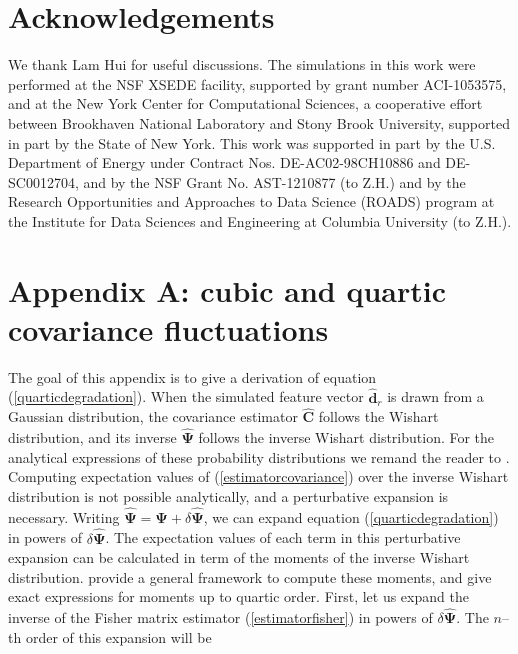 \documentclass[reprint,aps,prd,superscriptaddress,showkeys,showpacs]{revtex4-1}
\newcommand{\bb}[1]{\mathbf{#1}}
\newcommand{\bbh}[1]{\mathbf{\hat{#1}}}
\begin{document}
 

\section*{Acknowledgements}
We thank Lam Hui for useful discussions.  The simulations in this work
were performed at the NSF XSEDE facility, supported by grant number
ACI-1053575, and at the New York Center for Computational Sciences, a
cooperative effort between Brookhaven National Laboratory and Stony
Brook University, supported in part by the State of New York. This
work was supported in part by the U.S. Department of Energy under
Contract Nos. DE-AC02-98CH10886 and DE-SC0012704, and by the NSF Grant
No. AST-1210877 (to Z.H.) and by the Research Opportunities and
Approaches to Data Science (ROADS) program at the Institute for Data
Sciences and Engineering at Columbia University (to Z.H.).  



%    
\section*{Appendix A: cubic and quartic covariance fluctuations}
\label{appendixA}

The goal of this appendix is to give a derivation of equation (\ref{quarticdegradation}). When the simulated feature vector $\bbh{d}_r$ is drawn from a Gaussian distribution, the covariance estimator $\bbh{C}$ follows the Wishart distribution, and its inverse $\bbh{\Psi}$ follows the inverse Wishart distribution. For the analytical expressions of these probability distributions we remand the reader to \citep{Taylor12}. Computing expectation values of (\ref{estimatorcovariance}) over the inverse Wishart distribution is not possible analytically, and a perturbative expansion is necessary. Writing $\bbh{\Psi}=\bb{\Psi}+\delta\bbh{\Psi}$, we can expand equation (\ref{quarticdegradation}) in powers of $\delta\bbh{\Psi}$. The expectation values of each term in this perturbative expansion can be calculated in term of the moments of the inverse Wishart distribution. \citep{MasumotoWishart} provide a general framework to compute these moments, and give exact expressions for moments up to quartic order. First, let us expand the inverse of the Fisher matrix estimator (\ref{estimatorfisher}) in powers of $\delta\bbh{\Psi}$. The $n$--th order of this expansion will be 
\end{document}
